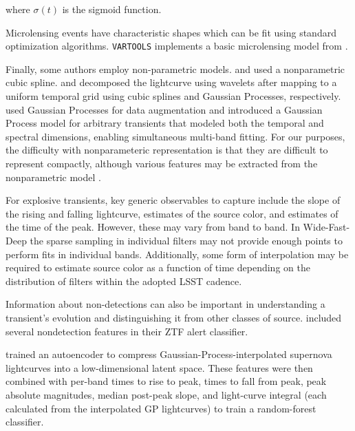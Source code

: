 \documentclass[DM,authoryear,toc]{lsstdoc}
\begin{document}
where $\sigma(t)$ is the sigmoid function.


Microlensing events have characteristic shapes which can be fit using standard optimization algorithms.
\texttt{VARTOOLS} implements a basic microlensing model from \citet{Wozniak:01:Microlensing}.

Finally, some authors employ non-parametric models.
\citet{Richards:12:SemiSupervisedSNe} and \citet{Ishida:13:PCASNClassification} used a nonparametric cubic spline.
\citet{Varughese:15:SNPhotCC} and \citet{Lochner:16:SNPhotCC} decomposed the lightcurve using wavelets after mapping to a uniform temporal grid using cubic splines and Gaussian Processes, respectively.
\citet{Revsbech:18:SNGP} used Gaussian Processes for data augmentation and \citet{Boone:19:AvocadoClassifier} introduced a Gaussian Process model for arbitrary transients that modeled both the temporal and spectral dimensions, enabling simultaneous multi-band fitting.
For our purposes, the difficulty with nonparameteric representation is that they are difficult to represent compactly, although various features may be extracted from the nonparametric model \citep[e.g.,][]{Boone:19:AvocadoClassifier}.

For explosive transients, key generic observables to capture include the slope of the rising and falling lightcurve, estimates of the source color, and estimates of the time of the peak.
However, these may vary from band to band.
In Wide-Fast-Deep the sparse sampling in individual filters may not provide enough points to perform fits in individual bands.
Additionally, some form of interpolation may be required to estimate source color as a function of time depending on the distribution of filters within the adopted LSST cadence.

Information about non-detections can also be important in understanding a transient's evolution and distinguishing it from other classes of source.
\citet{Sanchez-Saez:21:AlertClassification} included several nondetection features in their ZTF alert classifier.

\citet{Villar:20:SuperRAENN} trained an autoencoder to compress Gaussian-Process-interpolated supernova lightcurves into a low-dimensional latent space.  
These features were then combined with per-band times to rise to peak, times to fall from peak, peak absolute magnitudes, median post-peak slope, and light-curve integral (each calculated from the interpolated GP lightcurves) to train a random-forest classifier.
\end{document}
